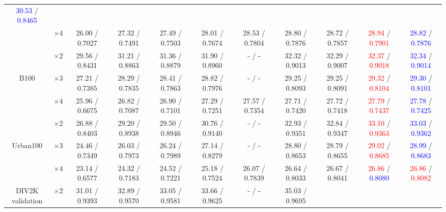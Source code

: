 \documentclass[10pt,twocolumn,letterpaper]{article}
\begin{document}
\begin{table*}[th]
{\begin{center}
\begin{adjustbox}{width=1.1\textwidth, center=\textwidth+0.5cm}
\begin{tabular} {|*{11}{c|}}
						\textcolor{blue}{30.53} / \textcolor{blue}{0.8465} \\
						& $\times 4$ &
						26.00 / 0.7027 & 27.32 / 0.7491 & 27.49 / 0.7503 & 28.01 / 0.7674 & 
						28.53 / 0.7804 &
						28.80 / 0.7876 & 
						28.72 / 0.7857 &
						\textcolor{red}{28.94} / \textcolor{red}{0.7901} & 
						\textcolor{blue}{28.82} / \textcolor{blue}{0.7876} \\
						\hline
						& $\times 2$ &
						29.56 / 0.8431 & 31.21 / 0.8863 & 31.36 / 0.8879 & 31.90 / 0.8960 & - / - &
						32.32 / 0.9013 & 
						32.29 / 0.9007 &
						\textcolor{red}{32.37} / \textcolor{red}{0.9018} & 
						\textcolor{blue}{32.34} / \textcolor{blue}{0.9014} \\						
						B100 & $\times 3$ &
						27.21 / 0.7385 & 28.29 / 0.7835 & 28.41 / 0.7863 & 28.82 / 0.7976 & - / - &
						29.25 / 0.8093 & 
						29.25 / 0.8091 &
						\textcolor{red}{29.32} / \textcolor{red}{0.8104} & 
						\textcolor{blue}{29.30} / \textcolor{blue}{0.8101} \\
						& $\times 4$ &
						25.96 / 0.6675 & 26.82 / 0.7087 & 26.90 / 0.7101 & 27.29 / 0.7251 & 
						27.57 / 0.7354 &
						27.71 / 0.7420 & 
						27.72 / 0.7418 &
						\textcolor{red}{27.79} / \textcolor{red}{0.7437} & 
						\textcolor{blue}{27.78} / \textcolor{blue}{0.7425} \\
						\hline
						& $\times 2$ &
						26.88 / 0.8403 & 29.20 / 0.8938 & 29.50 / 0.8946 & 30.76 / 0.9140 & - / - &
						32.93 / 0.9351 & 
						32.84 / 0.9347 &
						\textcolor{red}{33.10} / \textcolor{red}{0.9363} & 
						\textcolor{blue}{33.03} / \textcolor{blue}{0.9362} \\
						Urban100 & $\times 3$ &
						24.46 / 0.7349 & 26.03 / 0.7973 & 26.24 / 0.7989 & 27.14 / 0.8279 & - / - &
						28.80 / 0.8653 & 
						28.79 / 0.8655 &
						\textcolor{red}{29.02} / \textcolor{red}{0.8685} & 
						\textcolor{blue}{28.99} / \textcolor{blue}{0.8683} \\
						& $\times 4$ &
						23.14 / 0.6577 & 24.32 / 0.7183 & 24.52 / 0.7221 & 25.18 / 0.7524 & 
						26.07 / 0.7839 & 
						26.64 / 0.8033 & 
						26.67 / 0.8041 &
						\textcolor{red}{26.86} / \textcolor{blue}{0.8080} & 
						\textcolor{red}{26.86} / \textcolor{red}{0.8082} \\
						\hline\hline
						\multirow{3}{*}{\parbox[c]{1cm}{\centering DIV2K\\validation}}
						& $\times 2$ &
						31.01 / 0.9393 & 32.89 / 0.9570 & 33.05 / 0.9581 & 33.66 / 0.9625 & - / - &
						35.03 / 0.9695 &	

\end{tabular}
\end{adjustbox}
\end{center}}
\end{table*}
\end{document}
